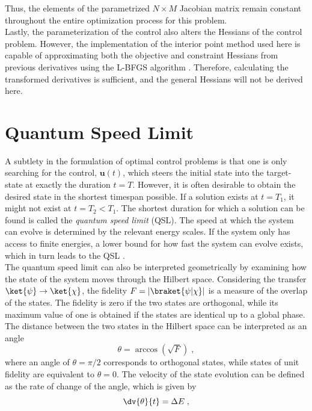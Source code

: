 Thus, the elements of the parametrized $N \times M$ Jacobian matrix remain constant throughout the entire optimization process for this problem.\\
Lastly, the parameterization of the control also alters the Hessians of the control problem. However, the implementation of the interior point method used here \cite{Wachter2006} is capable of approximating both the objective and constraint Hessians from previous derivatives using the L-BFGS algorithm \cite{Liu1989}. Therefore, calculating the transformed derivatives is sufficient, and the general Hessians will not be derived here.


\section{Quantum Speed Limit}
A subtlety in the formulation of optimal control problems is that one is only searching for the control, $\boldsymbol{u}(t)$, which steers the initial state into the target-state at exactly the duration $t = T$. However, it is often desirable to obtain the desired state in the shortest timespan possible. If a solution exists at $t= T_1$, it might not exist at $t = T_2 < T_1$. The shortest duration for which a solution can be found is called the \textit{quantum speed limit} (QSL). The speed at which the system can evolve is determined by the relevant energy scales. If the system only has access to finite energies, a lower bound for how fast the system can evolve exists, which in turn leads to the QSL \cite{Caneva2009}.\\
The quantum speed limit can also be interpreted geometrically by examining how the state of the system moves through the Hilbert space. Considering the transfer $\ket{\psi} \to \ket{\chi}$, the fidelity $F = |\braket{\psi | \chi}|$ is a measure of the overlap of the states. The fidelity is zero if the two states are orthogonal, while its maximum value of one is obtained if the states are identical up to a global phase. The distance between the two states in the Hilbert space can be interpreted as an angle \cite{Wootters1981}
\begin{equation}
	\theta = \arccos \left( \sqrt{F} \right) \; ,
\end{equation}
where an angle of $\theta = \pi / 2 $ corresponds to orthogonal states, while states of unit fidelity are equivalent to $\theta = 0 $. The velocity of the state evolution can be defined as the rate of change of the angle, which is given by \cite{Aharonov}
\begin{equation}
	\dv{\theta}{t} = \Delta E \; ,
\end{equation}

